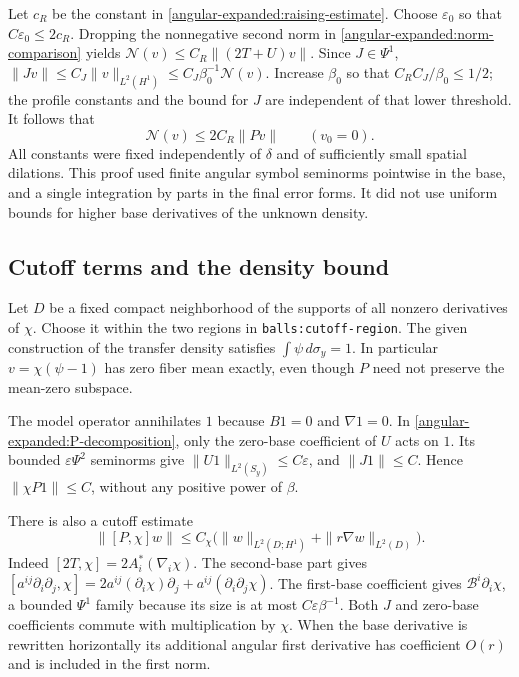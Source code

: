 \documentclass[11pt]{article}
\theoremstyle{definition}
\theoremstyle{remark}
\numberwithin{equation}{section}
\begin{document}
Let $c_R$ be the constant in \eqref{angular-expanded:raising-estimate}.  Choose
$\varepsilon_0$ so that $C\varepsilon_0\leq2c_R$.  Dropping the
nonnegative second norm in \eqref{angular-expanded:norm-comparison} yields
$\mathcal N(v)\leq C_R\|(2T+U)v\|$.
Since $J\in\Psi^1$,
$\|Jv\|\leq C_J\|v\|_{L^2(H^1)}\leq C_J\beta_0^{-1}\mathcal N(v)$.
Increase $\beta_0$ so that $C_RC_J/\beta_0\leq1/2$; the profile
constants and the bound for $J$ are independent of that lower threshold.
It follows that
\begin{equation}\label{angular-expanded:coercive-estimate}
 \mathcal N(v)\leq 2C_R\|Pv\|\qquad(v_0=0).
\end{equation}
All constants were fixed independently of $\delta$ and of sufficiently
small spatial dilations.  This proof used finite angular symbol seminorms
pointwise in the base, and a single integration by parts in the final
error forms.  It did not use uniform bounds for higher base derivatives
of the unknown density.

\subsection{Cutoff terms and the density bound}

Let $D$ be a fixed compact neighborhood of the supports of all nonzero
derivatives of $\chi$.  Choose it within the two regions in
\texttt{balls:cutoff-region}.  The given construction of the transfer
density satisfies $\int\psi\,d\sigma_y=1$.  In particular
$v=\chi(\psi-1)$ has zero fiber mean exactly, even though $P$ need not
preserve the mean-zero subspace.

The model operator annihilates $1$ because $B1=0$ and $\nabla1=0$.
In \eqref{angular-expanded:P-decomposition}, only the zero-base coefficient of
$U$ acts on $1$.  Its bounded $\varepsilon\Psi^2$ seminorms give
$\|U1\|_{L^2(S_y)}\leq C\varepsilon$, and
$\|J1\|\leq C$.  Hence $\|\chi P1\|\leq C$, without any positive
power of $\beta$.

There is also a cutoff estimate
\begin{equation}\label{angular-expanded:cutoff-bound}
 \|[P,\chi]w\|\leq C_\chi
       \bigl(\|w\|_{L^2(D;H^1)}+\|r\nabla w\|_{L^2(D)}\bigr).
\end{equation}
Indeed $[2T,\chi]=2A_i^*(\nabla_i\chi)$.
The second-base part gives
$[a^{ij}\partial_i\partial_j,\chi]
 =2a^{ij}(\partial_i\chi)\partial_j+a^{ij}(\partial_i\partial_j\chi)$.
The first-base coefficient gives $\mathcal B^i\partial_i\chi$, a bounded
$\Psi^1$ family because its size is at most $C\varepsilon\beta^{-1}$.
Both $J$ and zero-base coefficients commute with multiplication by $\chi$.
When the base derivative is rewritten horizontally its additional angular
first derivative has coefficient $O(r)$ and is included in the first norm.
\end{document}
